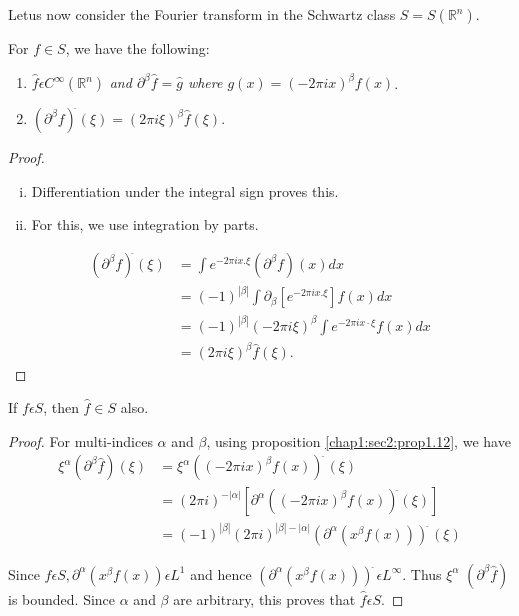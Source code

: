Let\pageoriginale us now consider the Fourier transform in the
Schwartz class $S=S (\mathbb{R}^n)$. 

\setcounter{prop}{11}
\begin{prop} \label{chap1:sec2:prop1.12}%
  For $f \in S$, we have the following:
  \begin{enumerate}[\rm i)]
  \item $\hat {f} \epsilon C^ \infty (\mathbb{R}^n)$ \textit{and
    $\partial ^\beta \hat{f}=\hat{g}$ where $g(x) = (-2 \pi i x)^\beta
    f(x)$}. 
  \item $(\partial ^\beta f)^{\hat{}}(\xi)=(2 \pi i \xi)^\beta \hat{f}(\xi)$.
  \end{enumerate}
\end{prop}

\begin{proof}
  \begin{enumerate}[i)]
  \item Differentiation under the integral sign proves this.
  \item For this, we use integration by parts.
  \end{enumerate}
  \begin{align*}
    (\partial^\beta f)^{\hat{}} (\xi) & = \int e^{-2 \pi i
      x. \xi}(\partial ^\beta f)(x)dx \\ 
    &= (-1)^{|\beta|} \int \partial_ \beta [e^{-2 \pi i x. \xi }]f(x)dx\\
    &= (-1)^{|\beta|} (-2 \pi i \xi)^\beta \int e^{-2 \pi i x\cdot \xi}f(x)dx\\
    &= (2 \pi i \xi)^\beta \hat{f}(\xi).
  \end{align*}
\end{proof}

\setcounter{coro}{12}
\begin{coro} \label{chap1:sec2:coro1.13} %
	If $f \epsilon S$, then $\hat{f} \in S$ also.
\end{coro}

\begin{proof}
  For  multi-indices $\alpha$ and $\beta$, using proposition
  \ref{chap1:sec2:prop1.12}, we have
  \begin{align*}
    \xi ^\alpha (\partial ^\beta \hat{f})(\xi) & = \xi^\alpha ((-2 \pi i
    x)^\beta f(x))^ {\hat{~}}(\xi)\\ 
    &= (2 \pi i)^{-|\alpha|}[\partial ^\alpha ((-2 \pi i x)^\beta f(x))
      ^{\hat{}} (\xi)]\\ 
    &= (-1)^{|\beta|}(2 \pi i)^{|\beta|-|\alpha|}(\partial ^\alpha
    (x^\beta f (x)))^{\hat{~}} (\xi ) 
  \end{align*}

  Since $f  \epsilon S, \partial ^\alpha (x^ \beta f(x)) \epsilon
  L^1$ and hence $(\partial ^ \alpha (x^\beta f(x)))^{\hat{~}}
  \epsilon L^ \infty$. Thus $\xi^ \alpha$ $(\partial ^\beta \hat{f})$
  is bounded. Since $\alpha$ and $\beta$ are arbitrary, this proves that
  $\hat{f} \epsilon S$. 
\end{proof}

